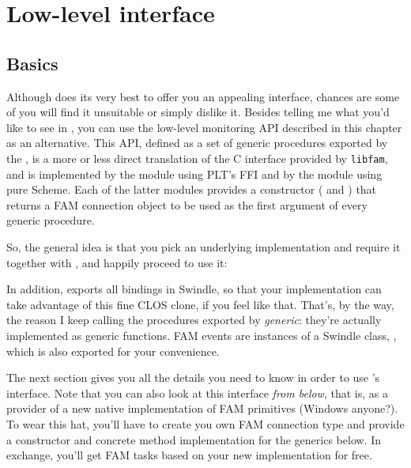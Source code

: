 
\chapter{Low-level interface}
\label{cha:low-level-interface}

\section{Basics}
\label{sec:basics}

Although  does its very best to offer you an appealing
interface, chances are some of you will find it unsuitable or simply
dislike it. Besides telling me what you'd like to see in
, you can use the low-level monitoring API described in
this chapter as an alternative. This API, defined as a set of generic
procedures exported by the , is a more or less direct
translation of the C interface provided by \texttt{libfam}, and is
implemented by the  module using PLT's FFI and by the
 module using pure Scheme. Each of the latter modules
provides a constructor ( and ) that
returns a FAM connection object to be used as the first argument of
every generic procedure.

So, the general idea is that you pick an underlying implementation and
require it together with , and happily proceed to use
it:

In addition,  exports all bindings in Swindle, so that
your implementation can take advantage of this fine CLOS clone, if you
feel like that. That's, by the way, the reason I keep calling the
procedures exported by  \textit{generic}: they're
actually implemented as generic functions. FAM events are instances of
a Swindle class, , which is also exported for your
convenience.

The next section gives you all the details you need to know in order
to use 's interface. Note that you can also look at this
interface \textit{from below}, that is, as a provider of a new native
implementation of FAM primitives (Windows anyone?). To wear this hat,
you'll have to create you own FAM connection type and provide a
constructor and concrete method implementation for the generics below.
In exchange, you'll get FAM tasks based on your new implementation for
free.

